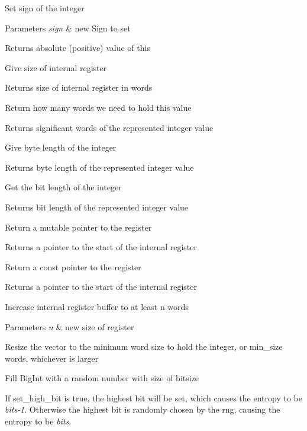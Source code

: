 Set sign of the integer 
\begin{DoxyParams}{Parameters}
{\em sign} & new Sign to set\\
\hline
\end{DoxyParams}
\begin{DoxyReturn}{Returns}
absolute (positive) value of this
\end{DoxyReturn}
Give size of internal register \begin{DoxyReturn}{Returns}
size of internal register in words
\end{DoxyReturn}
Return how many words we need to hold this value \begin{DoxyReturn}{Returns}
significant words of the represented integer value
\end{DoxyReturn}
Give byte length of the integer \begin{DoxyReturn}{Returns}
byte length of the represented integer value
\end{DoxyReturn}
Get the bit length of the integer \begin{DoxyReturn}{Returns}
bit length of the represented integer value
\end{DoxyReturn}
Return a mutable pointer to the register \begin{DoxyReturn}{Returns}
a pointer to the start of the internal register
\end{DoxyReturn}
Return a const pointer to the register \begin{DoxyReturn}{Returns}
a pointer to the start of the internal register
\end{DoxyReturn}
Increase internal register buffer to at least n words 
\begin{DoxyParams}{Parameters}
{\em n} & new size of register\\
\hline
\end{DoxyParams}
Resize the vector to the minimum word size to hold the integer, or min\+\_\+size words, whichever is larger

Fill Big\+Int with a random number with size of bitsize

If {\ttfamily set\+\_\+high\+\_\+bit} is true, the highest bit will be set, which causes the entropy to be {\itshape bits-\/1}. Otherwise the highest bit is randomly chosen by the rng, causing the entropy to be {\itshape bits}.


